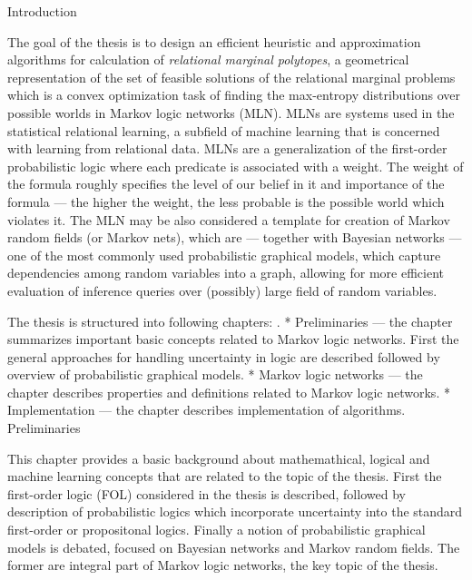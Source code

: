 \makefront
\chap Introduction
\par 
The goal of the thesis is to design an efficient heuristic and approximation algorithms for calculation of {\it relational marginal polytopes}, a geometrical representation of the set of feasible solutions of the relational marginal problems which is a convex optimization task of finding the max-entropy distributions over possible worlds in Markov logic networks (MLN). MLNs are systems used in the statistical relational learning, a subfield of machine learning that is concerned with learning from relational data. MLNs are a generalization of the first-order probabilistic logic where each predicate is associated with a weight. The weight of the formula roughly specifies the level of our belief in it and importance of the formula --- the higher the weight, the less probable is the possible world which violates it. The MLN may be also considered a template for creation of Markov random fields (or Markov nets), which are --- together with Bayesian networks --- one of the most commonly used probabilistic graphical models, which capture dependencies among random variables into a graph, allowing for more efficient evaluation of inference queries over (possibly) large field of random variables.

\par The thesis is structured into following chapters:
\begitems \style .
* Preliminaries --- the chapter summarizes important basic concepts related to Markov logic networks. First the general approaches for handling uncertainty in logic are described followed by overview of probabilistic graphical models.
* Markov logic networks --- the chapter describes properties and definitions related to Markov logic networks.
* Implementation --- the chapter describes implementation of algorithms.
\enditems
\chap Preliminaries
\par
This chapter provides a basic background about mathemathical, logical and machine learning concepts that are related to the topic of the thesis. First the first-order logic (FOL) considered in the thesis is described, followed by description of probabilistic logics which incorporate uncertainty into the standard first-order or propositonal logics. Finally a notion of probabilistic graphical models is debated, focused on Bayesian networks and Markov random fields. The former are integral part of Markov logic networks, the key topic of the thesis.

